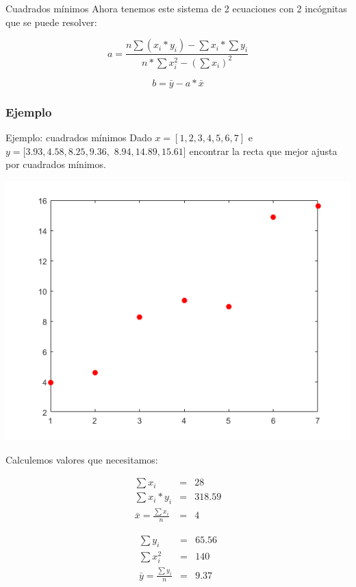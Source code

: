 \documentclass[xcolor=svgnames]{beamer} %
\theoremstyle{plain}
\theoremstyle{definition}
\begin{document}
\begin{frame}{Cuadrados mínimos}
Ahora tenemos este sistema de 2 ecuaciones con 2 incógnitas que se puede resolver:

\begin{tcolorbox}
$$a =  \frac{n \sum (x_i*y_i) -\sum x_i * \sum y_i}{n*\sum x_i^2 - (\sum x_i)^2}$$

$$b =  \bar y - a * \bar x  $$
\end{tcolorbox}
\end{frame}


\subsubsection{Ejemplo}
\begin{frame}{Ejemplo: cuadrados mínimos}
  Dado $x = [1, 2, 3, 4, 5, 6, 7]$ e $y = [3.93, 4.58, 8.25, 9.36,$ $ 8.94, 14.89, 15.61]$ encontrar la recta que mejor ajusta por cuadrados mínimos.
  
  \begin{minipage}{.3\linewidth}
    \includegraphics[width=\linewidth]{CuadradosMinimis/points.png} 
  \end{minipage}\vline \pause \begin{minipage}{.65\linewidth}
  Calculemos valores que necesitamos:
  \small
	\begin{minipage}{.45\linewidth}
	 $$\begin{array}{lll}
	   \sum x_i &=& 28 \\
	   \sum x_i*y_i &=& 318.59\\
	   \bar x = \frac{\sum x_i}{n} &=& 4
       \end{array}	  $$
	\end{minipage} 	\begin{minipage}{.45\linewidth}
	 $$\begin{array}{lll}
	   \sum y_i &=& 65.56 \\
	   \sum x_i^2 &=& 140\\
	   \bar y = \frac{\sum y_i}{n} &=& 9.37
       \end{array}	  $$
	\end{minipage} 	


  \end{minipage}
  
\end{frame}
\end{document}
